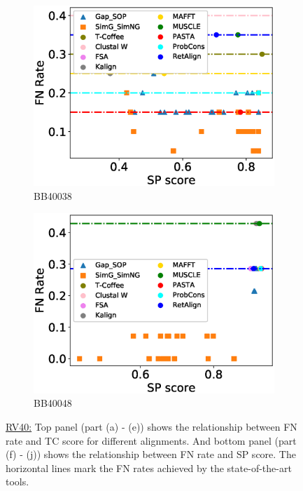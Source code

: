 \begin{figure}[!htbp]
\begin{adjustwidth}{-1.5cm}{-1cm}
\begin{subfigure}{0.22\textwidth}
			\includegraphics[width=\columnwidth]{Figure/summary/precomputedInit/Balibase/BB40038_fnrate_vs_sp_2}
			\caption{BB40038}
		\end{subfigure}	
		\begin{subfigure}{0.22\textwidth}
			\includegraphics[width=\columnwidth]{Figure/summary/precomputedInit/Balibase/BB40048_fnrate_vs_sp_2}
			\caption{BB40048}
		\end{subfigure}
		\end{adjustwidth}
		\caption[FN rate vs TC score on RV40]{\underline{RV40:} Top panel (part (a) - (e)) shows the relationship between FN rate and TC score for different alignments. And bottom panel (part (f) - (j)) shows the relationship between FN rate and SP score. The horizontal lines mark the FN rates achieved by the state-of-the-art tools.}
		\label{fig:rv40_fnrate_vs_tc}

\end{figure}
